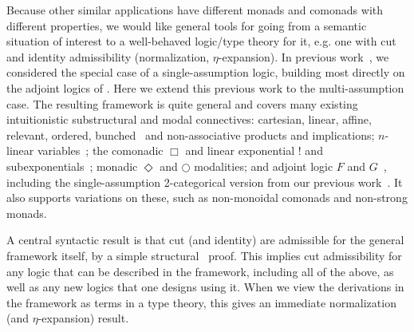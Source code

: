 Because other similar applications have different monads and comonads
with different properties, we would like general tools for going from a
semantic situation of interest to a well-behaved logic/type theory for
it, e.g. one with cut and identity admissibility (normalization,
$\eta$-expansion).  In previous work~\citep{ls16adjoint}, we considered
the special case of a single-assumption logic, building most directly on
the adjoint logics of
\citet{benton94mixed,bentonwadler96adjoint,reed09adjoint}.  Here we
extend this previous work to the multi-assumption case.  The resulting
framework is quite general and covers many existing intuitionistic
substructural and modal connectives: cartesian, linear, affine,
relevant, ordered, bunched~\citep{ohearnpym99bunched} and
non-associative products and implications; $n$-linear
variables~\citep{reed08namessubstructural,abel15modal,mcbride16nuttin};
the comonadic $\Box$ and linear exponential $!$ and
subexponentials~\citep{nigammiller09subexponentials,danos+93subexponentials};
monadic $\Diamond$ and $\bigcirc$ modalities; and adjoint logic $F$ and
$G$~\citep{benton94mixed,bentonwadler96adjoint,reed09adjoint}, including
the single-assumption 2-categorical version from our previous
work~\citep{ls16adjoint}.  It also supports variations on these, such as
non-monoidal comonads and non-strong monads.

A central syntactic result is that cut (and identity) are admissible for
the general framework itself, by a simple
structural~\citep{pfenning94cut} proof.  This implies cut admissibility
for any logic that can be described in the framework, including all of
the above, as well as any new logics that one designs using it.  When we
view the derivations in the framework as terms in a type theory, this
gives an immediate normalization (and $\eta$-expansion) result.

